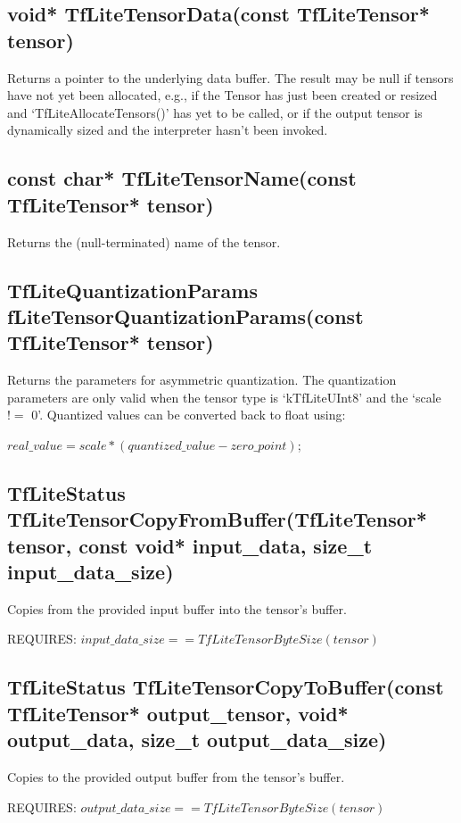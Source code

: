 \documentclass{ol-softwaremanual}
\begin{document}
\subsection{void* TfLiteTensorData(const TfLiteTensor* tensor)}

Returns a pointer to the underlying data buffer.
The result may be null if tensors have not yet been allocated, e.g., if the Tensor has just been created or resized and `TfLiteAllocateTensors()' has yet to be called, or if the output tensor is dynamically sized and the interpreter hasn't been invoked.

\subsection{const char* TfLiteTensorName(const TfLiteTensor* tensor)}

Returns the (null-terminated) name of the tensor.

\subsection{TfLiteQuantizationParams fLiteTensorQuantizationParams(const TfLiteTensor* tensor)}

Returns the parameters for asymmetric quantization. The quantization parameters are only valid when the tensor type is `kTfLiteUInt8' and the `scale $!=$ 0'. Quantized values can be converted back to float using: 

$real\_value = scale * (quantized\_value - zero\_point)$;

\subsection{TfLiteStatus TfLiteTensorCopyFromBuffer(TfLiteTensor* tensor, const void* input\_data, size\_t input\_data\_size)}

Copies from the provided input buffer into the tensor's buffer.

REQUIRES: $input\_data\_size == TfLiteTensorByteSize(tensor)$

\subsection{TfLiteStatus TfLiteTensorCopyToBuffer(const TfLiteTensor* output\_tensor, void* output\_data, size\_t output\_data\_size)}

Copies to the provided output buffer from the tensor's buffer.

REQUIRES: $output\_data\_size == TfLiteTensorByteSize(tensor)$
\end{document}
